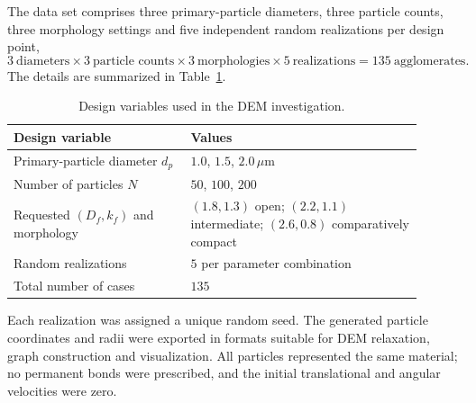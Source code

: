 \documentclass[12pt,a4paper]{article}
\begin{document}
The data set comprises three primary-particle diameters, three particle counts,
three morphology settings and five independent random realizations per design
point,
\begin{equation*}
	3\ \text{diameters}\times3\ \text{particle counts}
	\times3\ \text{morphologies}\times5\ \text{realizations}
	=135\ \text{agglomerates}.
\end{equation*}
The details are summarized in Table~\ref{tab:sim_parameter}.


\begin{table}[!tbp]
	\centering
	\caption{Design variables used in the DEM investigation.}
	\label{tab:sim_parameter}
	\begin{tabular}{p{0.39\linewidth} p{0.51\linewidth}}
		\toprule
		\textbf{Design variable} & \textbf{Values} \\
		\midrule
		Primary-particle diameter $d_p$
		& $1.0$, $1.5$, $2.0\,\mu\mathrm{m}$ \\
		Number of particles $N$
		& $50$, $100$, $200$ \\
		Requested $(D_f,k_f)$ and morphology
		& $(1.8,1.3)$ open; $(2.2,1.1)$ intermediate;
		$(2.6,0.8)$ comparatively compact \\
		Random realizations
		& $5$ per parameter combination \\
		Total number of cases
		& $135$ \\
		\bottomrule
	\end{tabular}
\end{table}

Each realization was assigned a unique random seed. The generated particle
coordinates and radii were exported in formats suitable for DEM relaxation,
graph construction and visualization. All particles represented the same
material; no permanent bonds were prescribed, and the initial translational
and angular velocities were zero.

\end{document}
